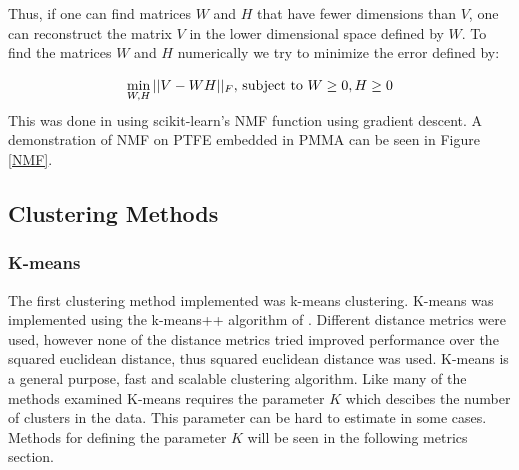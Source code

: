 \documentclass[a4paper,11pt]{article}
\begin{document}
Thus, if one can find matrices $W$ and $H$ that have fewer dimensions than $V$, one can reconstruct the matrix $V$ in the lower dimensional space defined by $W$. To find the matrices $W$ and $H$ numerically we try to minimize the error defined by:

\begin{equation}
\min_{W,H} || V - WH ||_F,$ subject to $W \geq 0, H \geq 0
\end{equation}
This was done in using scikit-learn's NMF function using gradient descent. A demonstration of NMF on PTFE embedded in PMMA can be seen in Figure \ref{NMF}.

\subsection{Clustering Methods}

\subsubsection{K-means}

The first clustering method implemented was k-means clustering. K-means was implemented using the k-means++ algorithm of \cite{ArthurK-means++:Seeding}. Different distance metrics were used, however none of the distance metrics tried improved performance over the squared euclidean distance, thus squared euclidean distance was used. K-means is a general purpose, fast and scalable clustering algorithm. Like many of the methods examined K-means requires the parameter $K$ which descibes the number of clusters in the data. This parameter can be hard to estimate in some cases. Methods for defining the parameter $K$ will be seen in the following metrics section.
\end{document}
